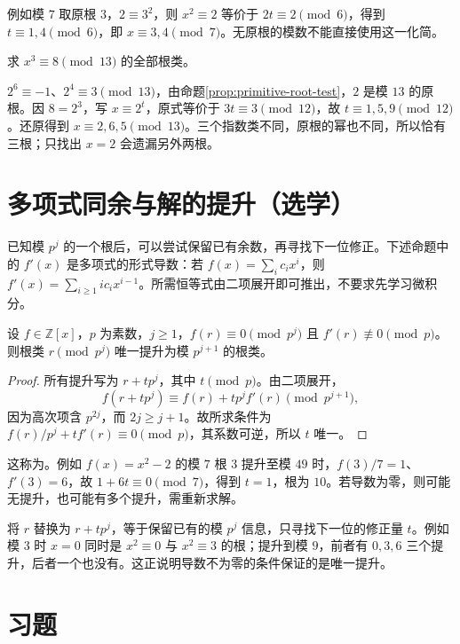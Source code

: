 \documentclass[UTF8,12pt,a4paper,fontset=fandol]{ctexbook}
\begin{document}
例如模 $7$ 取原根 $3$，$2\equiv3^2$，则 $x^2\equiv2$ 等价于 $2t\equiv2\pmod6$，得到 $t\equiv1,4\pmod6$，即 $x\equiv3,4\pmod7$。无原根的模数不能直接使用这一化简。

\begin{example}
求 $x^3\equiv8\pmod{13}$ 的全部根类。
\end{example}
\begin{solve}
$2^6\equiv-1$、$2^4\equiv3\pmod{13}$，由命题\ref{prop:primitive-root-test}，$2$ 是模 $13$ 的原根。因 $8=2^3$，写 $x\equiv2^t$，原式等价于 $3t\equiv3\pmod{12}$，故 $t\equiv1,5,9\pmod{12}$。还原得到 $x\equiv2,6,5\pmod{13}$。三个指数类不同，原根的幂也不同，所以恰有三根；只找出 $x=2$ 会遗漏另外两根。
\end{solve}

\section{多项式同余与解的提升（选学）}

已知模 $p^j$ 的一个根后，可以尝试保留已有余数，再寻找下一位修正。下述命题中的 $f'(x)$ 是多项式的形式导数：若 $f(x)=\sum_i c_ix^i$，则 $f'(x)=\sum_{i\ge1}ic_ix^{i-1}$。所需恒等式由二项展开即可推出，不要求先学习微积分。

\begin{proposition}[简单根的亨泽尔提升]
\label{prop:hensel}
设 $f\in\mathbb Z[x]$，$p$ 为素数，$j\ge1$，$f(r)\equiv0\pmod{p^j}$ 且 $f'(r)\not\equiv0\pmod p$。则根类 $r\pmod{p^j}$ 唯一提升为模 $p^{j+1}$ 的根类。
\end{proposition}
\begin{proof}
所有提升写为 $r+tp^j$，其中 $t\pmod p$。由二项展开，
\[
 f(r+tp^j)\equiv f(r)+tp^jf'(r)\pmod{p^{j+1}},
\]
因为高次项含 $p^{2j}$，而 $2j\ge j+1$。故所求条件为 $f(r)/p^j+tf'(r)\equiv0\pmod p$，其系数可逆，所以 $t$ 唯一。
\end{proof}

这称为。例如 $f(x)=x^2-2$ 的模 $7$ 根 $3$ 提升至模 $49$ 时，$f(3)/7=1$、$f'(3)=6$，故 $1+6t\equiv0\pmod7$，得到 $t=1$，根为 $10$。若导数为零，则可能无提升，也可能有多个提升，需重新求解。

将 $r$ 替换为 $r+tp^j$，等于保留已有的模 $p^j$ 信息，只寻找下一位的修正量 $t$。例如模 $3$ 时 $x=0$ 同时是 $x^2\equiv0$ 与 $x^2\equiv3$ 的根；提升到模 $9$，前者有 $0,3,6$ 三个提升，后者一个也没有。这正说明导数不为零的条件保证的是唯一提升。

\section{习题}
\end{document}
